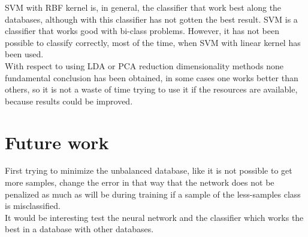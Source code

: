SVM with RBF kernel is, in general, the classifier that work best along the databases, although with this classifier has not gotten the best result. SVM is a classifier that works good with bi-class problems. However, it has not been possible to classify correctly, most of the time, when SVM with linear kernel has been used.\\

With respect to using LDA or PCA reduction dimensionality methods none fundamental conclusion has been obtained, in some cases one works better than others, so it is not a waste of time trying to use it if the resources are available, because results could be improved.\\


\section{Future work}
First trying to minimize the unbalanced database, like it is not possible to get more samples, change the error in that way that the network does not be penalized as much as will be during training if a sample of the less-samples class  is misclassified.\\

It would be interesting test the neural network and the classifier which works the best in a database with other databases. \\
